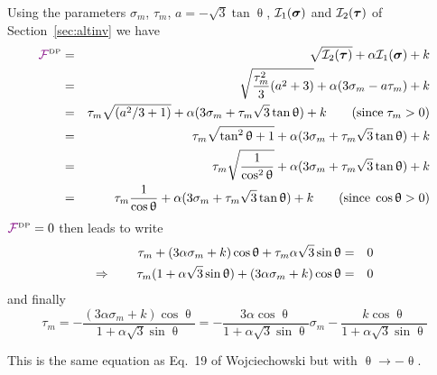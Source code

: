 Using the parameters $\sigma_m$, $\tau_m$, $a=-\sqrt{3}\tan\uptheta$, ${\cal I}_1({\bm \sigma})$ 
and ${\cal I}_2({\bm \tau})$ of Section~\ref{sec:altinv} we have
\begin{eqnarray}
{\color{violet}\cal F}^{\text{\tiny DP}}
&=&  \sqrt{{\cal I}_2({\bm \tau})} + \alpha {\cal I}_1({\bm \sigma}) + k \nonumber\\
&=& \sqrt{\frac{\tau_m^2}{3}(a^2+3)} + \alpha (3\sigma_m-a\tau_m) + k \nonumber\\ 
&=& \tau_m \sqrt{(a^2/3+1)} + \alpha (3\sigma_m+\tau_m\sqrt{3}\tan\uptheta ) + k    \qquad ({\rm since }\; \tau_m>0)\nonumber\\ 
&=& \tau_m \sqrt{\tan^2\uptheta+1} + \alpha (3\sigma_m+\tau_m\sqrt{3}\tan\uptheta ) + k  \nonumber\\
&=& \tau_m \sqrt{ \frac{1}{\cos^2\uptheta} } + \alpha (3\sigma_m+\tau_m\sqrt{3}\tan\uptheta ) + k  \nonumber\\
&=& \tau_m \frac{1}{\cos\uptheta} +\alpha (3\sigma_m+\tau_m\sqrt{3}\tan\uptheta ) + k  \qquad ({\rm since }\; \cos\uptheta >0)\nonumber
\end{eqnarray}
${\color{violet}\cal F}^{\text{\tiny DP}}=0$ then leads to write
\begin{eqnarray}
\tau_m  + (3 \alpha \sigma_m+k)\cos\uptheta  + \tau_m \alpha \sqrt{3}\sin\uptheta  &=&0 \nonumber\\
\Rightarrow \qquad \tau_m(1 + \alpha \sqrt{3}\sin\uptheta)  + (3 \alpha \sigma_m+k)\cos\uptheta &=&0 \nonumber
\end{eqnarray}
and finally
\[
\tau_m = -\frac{(3 \alpha \sigma_m+k)\cos\uptheta}{1 + \alpha \sqrt{3}\sin\uptheta}
= -\frac{3 \alpha \cos\uptheta}{1 + \alpha \sqrt{3}\sin\uptheta} \sigma_m 
-\frac{k\cos\uptheta}{1 + \alpha \sqrt{3}\sin\uptheta}
\]
\begin{remark}
This is the same equation as Eq.~19 of Wojciechowski \cite{wojc18} but with $\uptheta \rightarrow -\uptheta$. 
\end{remark}

\vspace{.5cm}

